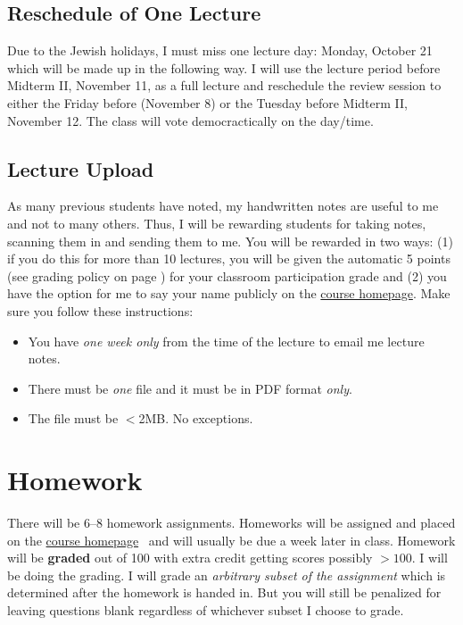 \documentclass[12pt]{article}
\newcommand{\coursewebpage}{\href{https://github.com/kapelner/QC_Math_621_Fall_2019}{course homepage}}
\begin{document}
\subsection*{Reschedule of One Lecture}

Due to the Jewish holidays, I must miss one lecture day: Monday, October 21 which will be made up in the following way. I will use the lecture period before Midterm II, November 11, as a full lecture and reschedule the review session to either the Friday before (November 8) or the Tuesday before Midterm II, November 12. The class will vote democractically on the day/time. 

\subsection*{Lecture Upload}

As many previous students have noted, my handwritten notes are useful to me and not to many others. Thus, I will be rewarding students for taking notes, scanning them in and sending them to me. You will be rewarded in two ways: (1) if you do this for more than 10 lectures, you will be given the automatic 5 points (see grading policy on page \pageref{sec:grading}) for your classroom participation grade and (2) you have the option for me to say your name publicly on the \coursewebpage. Make sure you follow these instructions:

\begin{itemize}
\item You have \emph{one week only} from the time of the lecture to email me lecture notes.
\item There must be \emph{one} file and it must be in PDF format \textit{only}.
\item The file must be $<$2MB. No exceptions.
\end{itemize}

\section*{Homework}

There will be 6--8 homework assignments. Homeworks will be assigned and placed on the \coursewebpage~ and will usually be due a week later in class. Homework will be \textbf{graded} out of 100 with extra credit getting scores possibly $> 100$. I will be doing the grading. I will grade an \textit{arbitrary subset of the assignment} which is determined after the homework is handed in. But you will still be penalized for leaving questions blank regardless of whichever subset I choose to grade. 
\end{document}
